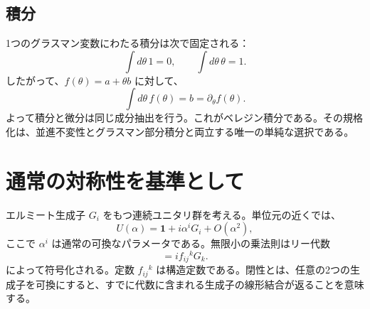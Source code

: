 \begin{classroomqa}
\end{classroomqa}

\begin{classroomqa}
\end{classroomqa}

\subsection{積分}

1つのグラスマン変数にわたる積分は次で固定される：
\begin{equation}
\int d\theta\,1=0,
\qquad
\int d\theta\,\theta=1.
\end{equation}
したがって、\(f(\theta)=a+\theta b\) に対して、
\begin{equation}
\int d\theta\,f(\theta)=b=\partial_\theta f(\theta).
\end{equation}
よって積分と微分は同じ成分抽出を行う。これがベレジン積分である。その規格化は、並進不変性とグラスマン部分積分と両立する唯一の単純な選択である。

\section{通常の対称性を基準として}

エルミート生成子 \(G_i\) をもつ連続ユニタリ群を考える。単位元の近くでは、
\begin{equation}
U(\alpha)=\mathbf 1+i\alpha^iG_i+O(\alpha^2),
\end{equation}
ここで \(\alpha^i\) は通常の可換なパラメータである。無限小の乗法則はリー代数
\begin{equation}
[G_i,G_j]=i f_{ij}{}^{k}G_k.
\end{equation}
によって符号化される。定数 \(f_{ij}{}^k\) は構造定数である。閉性とは、任意の2つの生成子を可換にすると、すでに代数に含まれる生成子の線形結合が返ることを意味する。


